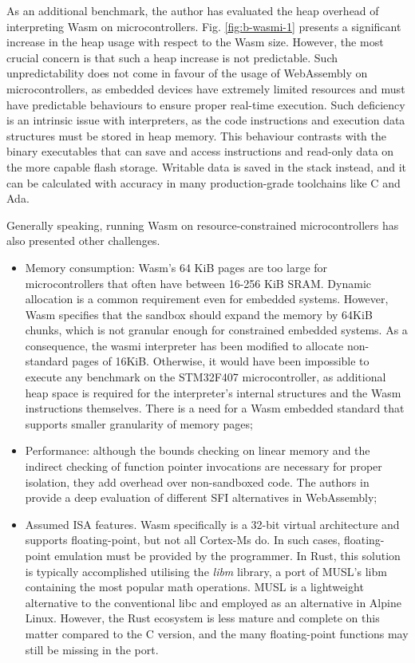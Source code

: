 As an additional benchmark, the author has evaluated the heap overhead of interpreting Wasm on microcontrollers. Fig. \ref{fig:b-wasmi-1} presents a significant increase in the heap usage with respect to the Wasm size. However, the most crucial concern is that such a heap increase is not predictable. Such unpredictability does not come in favour of the usage of WebAssembly on microcontrollers, as embedded devices have extremely limited resources and must have predictable behaviours to ensure proper real-time execution. Such deficiency is an intrinsic issue with interpreters, as the code instructions and execution data structures must be stored in heap memory. This behaviour contrasts with the binary executables that can save and access instructions and read-only data on the more capable flash storage. Writable data is saved in the stack instead, and it can be calculated with accuracy in many production-grade toolchains like C and Ada.

Generally speaking, running Wasm on resource-constrained microcontrollers has also presented other challenges.

\begin{itemize}
    \item Memory consumption: Wasm's 64 KiB pages are too large for microcontrollers that often have between 16-256 KiB SRAM. Dynamic allocation is a common requirement even for embedded systems. However, Wasm specifies that the sandbox should expand the memory by 64KiB chunks, which is not granular enough for constrained embedded systems. As a consequence, the wasmi interpreter has been modified to allocate non-standard pages of 16KiB. Otherwise, it would have been impossible to execute any benchmark on the STM32F407 microcontroller, as additional heap space is required for the interpreter's internal structures and the Wasm instructions themselves. There is a need for a Wasm embedded standard that supports smaller granularity of memory pages;
    \item Performance: although the bounds checking on linear memory and the indirect checking of function pointer invocations are necessary for proper isolation, they add overhead over non-sandboxed code. The authors in \cite{peach2020ewasm} provide a deep evaluation of different SFI alternatives in WebAssembly;
    \item Assumed ISA features. Wasm specifically is a 32-bit virtual architecture and supports floating-point, but not all Cortex-Ms do. In such cases, floating-point emulation must be provided by the programmer. In Rust, this solution is typically accomplished utilising the \emph{libm} library, a port of MUSL's libm containing the most popular math operations. MUSL is a lightweight alternative to the conventional libc and employed as an alternative in Alpine Linux. However, the Rust ecosystem is less mature and complete on this matter compared to the C version, and the many floating-point functions may still be missing in the port. 
\end{itemize}

